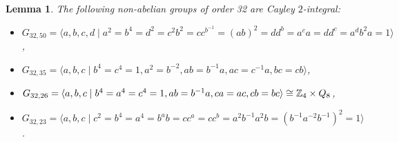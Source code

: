 \documentclass{amsart}
\newtheorem{lem}[thm]{Lemma}
\begin{document}
\begin{lem}\label{32yes}
	The following non-abelian groups of order 32 are Cayley $2$-integral:
	\begin{itemize}
		\item[(1)] $G_{32,50}=\langle a,b,c,d\mid a^2=b^4=d^2=c^2b^2=cc^{b^{-1}}=(ab)^2=dd^b=a^ca=dd^c=a^db^2a=1\rangle$,
		\item[(2)] $G_{32,35}=\langle a,b,c\mid b^4=c^4=1, a^2=b^{-2}, ab=b^{-1}a,ac=c^{-1}a,bc=cb\rangle$,
		\item[(3)] $G_{32,26}=\langle a,b,c\mid  b^4=a^4=c^4=1, ab=b^{-1}a, ca=ac, cb=bc\rangle\cong\Bbb Z_4\times Q_8$,
		\item[(4)] $G_{32,23}=\langle a,b,c\mid c^2=b^4=a^4=b^ab=cc^a= cc^b=a^2b^{-1}a^2b=(b^{-1}a^{-2}b^{-1})^2=1 \rangle$.
	\end{itemize}
\end{lem}
\end{document}
